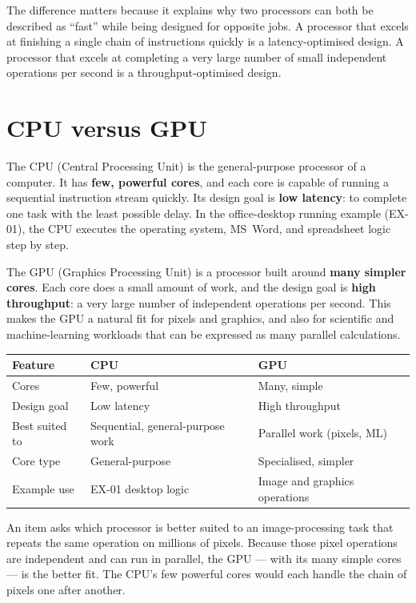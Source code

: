 The difference matters because it explains why two processors can both be
described as ``fast'' while being designed for opposite jobs. A processor that
excels at finishing a single chain of instructions quickly is a
latency-optimised design. A processor that excels at completing a very large
number of small independent operations per second is a
throughput-optimised design.

\section{CPU versus GPU}
The CPU (Central Processing Unit) is the general-purpose processor of a
computer. It has \textbf{few, powerful cores}, and each core is capable of
running a sequential instruction stream quickly. Its design goal is
\textbf{low latency}: to complete one task with the least possible delay. In
the office-desktop running example (EX-01), the CPU executes the operating
system, \mbox{MS Word}, and spreadsheet logic step by step.

The GPU (Graphics Processing Unit) is a processor built around
\textbf{many simpler cores}. Each core does a small amount of work, and the
design goal is \textbf{high throughput}: a very large number of independent
operations per second. This makes the GPU a natural fit for pixels and
graphics, and also for scientific and machine-learning workloads that can be
expressed as many parallel calculations.

\begin{center}
\begin{tabular}{p{}p{}p{}}
\toprule
\textbf{Feature} & \textbf{CPU} & \textbf{GPU}\\
\midrule
Cores & Few, powerful & Many, simple\\
Design goal & Low latency & High throughput\\
Best suited to & Sequential, general-purpose work & Parallel work (pixels, ML)\\
Core type & General-purpose & Specialised, simpler\\
Example use & EX-01 desktop logic & Image and graphics operations\\
\bottomrule
\end{tabular}
\end{center}

\begin{example}
An item asks which processor is better suited to an image-processing task
that repeats the same operation on millions of pixels. Because those pixel
operations are independent and can run in parallel, the GPU --- with its many
simple cores --- is the better fit. The CPU's few powerful cores would each
handle the chain of pixels one after another.
\end{example}

